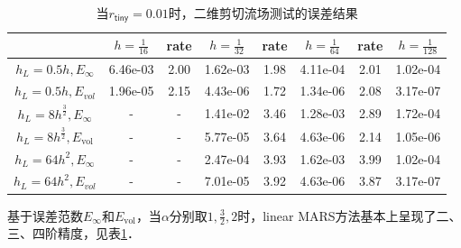 \begin{table}[htbp]
	\label{tab1}
	\centering
	\caption[二维剪切流场测试的误差结果]{当$r_{\mathsf{tiny}}=0.01$时，二维剪切流场测试的误差结果}
	\begin{tabular}{c|ccccccc}
		\hline \hline
		&$h=\frac{1}{16}$ & rate & $h=\frac{1}{32}$ 
		& rate & $h=\frac{1}{64}$ & rate &  $h=\frac{1}{128}$
		\\ \hline 
		$h_L=0.5h,E_{\infty}$ & 6.46e-03 & 2.00 & 1.62e-03 & 1.98 &4.11e-04 & 2.01 & 1.02e-04
		\\
		$h_L=0.5h,E_{vol}$   & 1.96e-05 & 2.15 & 4.43e-06 & 1.72 &1.34e-06 & 2.08 & 3.17e-07
		\\ \hline 
		$h_L=8h^{\frac{3}{2}},E_{\infty}$ & - & - & 1.41e-02 & 3.46 &1.28e-03 & 2.89 & 1.72e-04
		\\
		$h_L=8h^{\frac{3}{2}},E_{\mathrm{vol}}$ &- & - & 5.77e-05 & 3.64 &4.63e-06 & 2.14 & 1.05e-06
		\\ \hline 
		$h_L=64h^2,E_{\infty}$ & - & - & 2.47e-04 & 3.93 &1.62e-03 & 3.99 & 1.02e-04
		\\
		$h_L=64h^2,E_{vol}$  & - & - & 7.01e-05 & 3.92 &4.63e-06 & 3.87 & 3.17e-07
		\\ \hline \hline
	\end{tabular}
\end{table}  

基于误差范数$E_{\infty}$和$E_{\mathrm{vol}}$，当$\alpha $分别取$1, \frac{3}{2}, 2$时，linear MARS方法基本上呈现了二、三、四阶精度，见表\ref{tab1}．
\newpage

